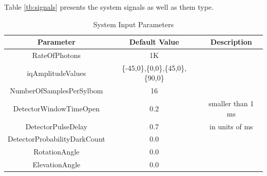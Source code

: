 \begin{refsection}
\begin{table}[H]
\begin{tabular}{|c|c|c|}
\end{tabular}
\end{table}

Table \ref{tb:signals} presents the system signals as well as them type.

\begin{table}[H]
\centering
\caption{System Input Parameters}
\label{tb:inputparameters}
\begin{tabular}{|c|c|c|}
\hline
\textbf{Parameter}                      & \textbf{Default Value}                                & \textbf{Description} \\ \hline
RateOfPhotons                           & 1K                                                    &                 \\ \hline
iqAmplitudeValues                       & \{-45,0\},\{0,0\},\{45,0\},\{90,0\}   &                 \\ \hline
NumberOfSamplesPerSylbom                & 16                                                    &                   \\ \hline
DetectorWindowTimeOpen                  & 0.2                                                   & smaller than 1 ms \\ \hline
DetectorPulseDelay                      & 0.7                                                   & in units of ms \\ \hline
DetectorProbabilityDarkCount            & 0.0                                                   &    \\ \hline
RotationAngle                           & 0.0                                                   & \\ \hline
ElevationAngle                          & 0.0                                                   & \\ \hline

\end{tabular}
\end{table}


\end{refsection}
